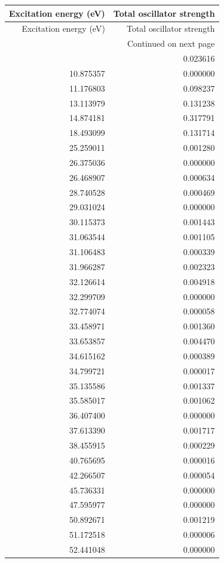 \begin{longtable}{rr}
\toprule
Excitation energy (eV) & Total oscillator strength \\
\midrule
\endfirsthead
\toprule
Excitation energy (eV) & Total oscillator strength \\
\midrule
\endhead
\midrule
\multicolumn{2}{r}{Continued on next page} \\
\midrule
\endfoot
\bottomrule
\endlastfoot
8.760051 & 0.023616 \\
10.875357 & 0.000000 \\
11.176803 & 0.098237 \\
13.113979 & 0.131238 \\
14.874181 & 0.317791 \\
18.493099 & 0.131714 \\
25.259011 & 0.001280 \\
26.375036 & 0.000000 \\
26.468907 & 0.000634 \\
28.740528 & 0.000469 \\
29.031024 & 0.000000 \\
30.115373 & 0.001443 \\
31.063544 & 0.001105 \\
31.106483 & 0.000339 \\
31.966287 & 0.002323 \\
32.126614 & 0.004918 \\
32.299709 & 0.000000 \\
32.774074 & 0.000058 \\
33.458971 & 0.001360 \\
33.653857 & 0.004470 \\
34.615162 & 0.000389 \\
34.799721 & 0.000017 \\
35.135586 & 0.001337 \\
35.585017 & 0.001062 \\
36.407400 & 0.000000 \\
37.613390 & 0.001717 \\
38.455915 & 0.000229 \\
40.765695 & 0.000016 \\
42.266507 & 0.000054 \\
45.736331 & 0.000000 \\
47.595977 & 0.000000 \\
50.892671 & 0.001219 \\
51.172518 & 0.000006 \\
52.441048 & 0.000000 \\

\end{longtable}
